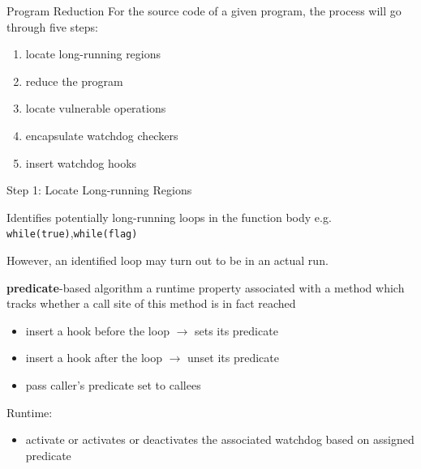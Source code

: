 \documentclass[aspectratio=169]{beamer}
\newcommand{\red}[1]{{\color{red}{#1}}}
\newcommand{\blue}[1]{{\color{blue}{#1}}}
\begin{document}
\begin{frame}{Program Reduction}
    For the source code of a given program, the process will go through five steps:
    \vspace{2em}
    \begin{enumerate}
        \item locate long-running regions
        \item  reduce the program
        \item  locate vulnerable operations
        \item  encapsulate watchdog checkers
        \item  insert watchdog hooks
    \end{enumerate}
\end{frame}

\begin{frame}{Step 1: Locate Long-running Regions}
    \begin{block}{Identifies potentially long-running loops in the function body}
        e.g. \texttt{while(true)},\texttt{while(flag)}
    \end{block}

    However, an identified \red{long-running} loop may turn out to be \blue{short-lived} in an actual run.

    \begin{block}{\textbf{predicate}-based algorithm}
        a runtime property associated with a method which tracks whether a call site of this method is in fact reached
        \begin{itemize}
            \item insert a hook before the loop $\to$  sets its predicate
            \item insert a hook after the loop $\to$ unset its predicate
            \item pass caller’s predicate set to callees
        \end{itemize}
        Runtime:
        \begin{itemize}
            \item activate or activates or deactivates the associated watchdog based on assigned predicate
        \end{itemize}
    \end{block}

\end{frame}
\end{document}
